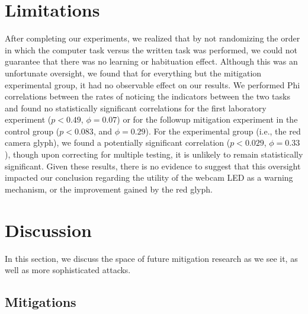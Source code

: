 \documentclass{sigchi}
\begin{document}

\section{Limitations}
After completing our experiments, we realized that by not randomizing the order in which the computer task versus the written task was performed, we could not guarantee that there was no learning or habituation effect. Although this was an unfortunate oversight, we found that for everything but the mitigation experimental group, it had no observable effect on our results. We performed Phi correlations between the rates of noticing the indicators between the two tasks and found no statistically significant correlations for the first laboratory experiment ($p<0.49$, $\phi=0.07$) or for the followup mitigation experiment in the control group ($p<0.083$, and $\phi=0.29$). For the experimental group (i.e., the red camera glyph), we found a potentially significant correlation ($p<0.029$, $\phi=0.33$), though upon correcting for multiple testing, it is unlikely to remain statistically significant. Given these results, there is no evidence to suggest that this oversight impacted our conclusion regarding the utility of the webcam LED as a warning mechanism, or the improvement gained by the red glyph.

\section{Discussion}
In this section, we discuss the space of future mitigation research as we see it, as well as more sophisticated attacks.

\subsection{Mitigations}
\end{document}

